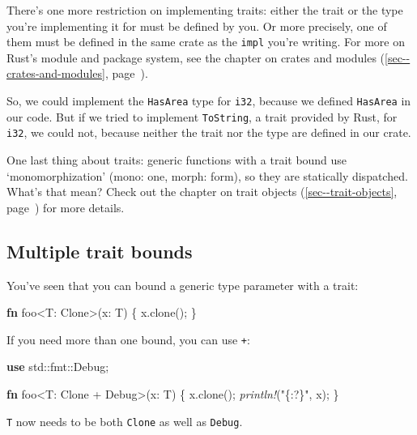 \documentclass[a4paper,]{book}
\renewcommand*{\hyperlink}[2]{%
 #2 (\autoref{#1}, page~\pageref{#1})}
\newenvironment{Shaded}{\begin{snugshade}}{\end{snugshade}}
\newcommand{\KeywordTok}[1]{\textcolor[rgb]{0.13,0.29,0.53}{\textbf{{#1}}}}
\newcommand{\StringTok}[1]{\textcolor[rgb]{0.31,0.60,0.02}{{#1}}}
\newcommand{\BuiltInTok}[1]{{#1}}
\newcommand{\PreprocessorTok}[1]{\textcolor[rgb]{0.56,0.35,0.01}{\textit{{#1}}}}
\newcommand{\NormalTok}[1]{{#1}}
\begin{document}
There's one more restriction on implementing traits: either the trait or
the type you're implementing it for must be defined by you. Or more
precisely, one of them must be defined in the same crate as the
\texttt{impl} you're writing. For more on Rust's module and package
system, see the chapter on
\protect\hyperlink{sec--crates-and-modules}{crates and modules}.

So, we could implement the \texttt{HasArea} type for \texttt{i32},
because we defined \texttt{HasArea} in our code. But if we tried to
implement \texttt{ToString}, a trait provided by Rust, for \texttt{i32},
we could not, because neither the trait nor the type are defined in our
crate.

One last thing about traits: generic functions with a trait bound use
`monomorphization' (mono: one, morph: form), so they are statically
dispatched. What's that mean? Check out the chapter on
\protect\hyperlink{sec--trait-objects}{trait objects} for more details.

\subsection{Multiple trait bounds}\label{multiple-trait-bounds}

You've seen that you can bound a generic type parameter with a trait:

\begin{Shaded}
\begin{Highlighting}[]
\KeywordTok{fn} \NormalTok{foo<T: }\BuiltInTok{Clone}\NormalTok{>(x: T) \{}
    \NormalTok{x.clone();}
\NormalTok{\}}
\end{Highlighting}
\end{Shaded}

If you need more than one bound, you can use \texttt{+}:

\begin{Shaded}
\begin{Highlighting}[]
\KeywordTok{use} \NormalTok{std::fmt::}\BuiltInTok{Debug}\NormalTok{;}

\KeywordTok{fn} \NormalTok{foo<T: }\BuiltInTok{Clone} \NormalTok{+ }\BuiltInTok{Debug}\NormalTok{>(x: T) \{}
    \NormalTok{x.clone();}
    \PreprocessorTok{println!}\NormalTok{(}\StringTok{"\{:?\}"}\NormalTok{, x);}
\NormalTok{\}}
\end{Highlighting}
\end{Shaded}

\texttt{T} now needs to be both \texttt{Clone} as well as
\texttt{Debug}.
\end{document}
